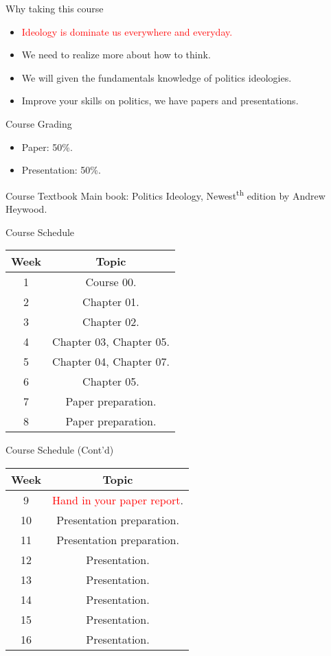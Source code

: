 \documentclass{beamer}
\begin{document}
\begin{frame}{Why taking this course}
\begin{itemize}
\pause
\item \textcolor{red}{Ideology is dominate us everywhere and everyday.}
\pause
\item We need to realize more about how to think.
\pause
\item We will given the fundamentals knowledge of politics ideologies.
\pause
\item Improve your skills on politics, we have papers and presentations.
\end{itemize}
\end{frame}
\begin{frame}{Course Grading}
\begin{itemize}
\pause
\item Paper: 50\%.
\vspace{1em}
\pause
\item Presentation: 50\%.
\end{itemize}
\end{frame}
\begin{frame}{Course Textbook}
\pause
Main book: Politics Ideology, Newest\textsuperscript{th} edition by Andrew Heywood. \\
\end{frame}
\begin{frame}{Course Schedule}
\begin{center}
\begin{tabular}{|c|c|}
\hline
Week & Topic \\
\hline
1 & Course 00.\\
\hline
2 & Chapter 01.\\
\hline
3 & Chapter 02.\\
\hline
4 & Chapter 03, Chapter 05.\\
\hline
5 & Chapter 04, Chapter 07.\\
\hline
6 & Chapter 05.\\
\hline
7 & Paper preparation.\\
\hline
8 & Paper preparation.\\
\hline
\end{tabular}
\end{center}
\end{frame}
\begin{frame}{Course Schedule (Cont'd)}
\begin{center}
\begin{tabular}{|c|c|}
\hline
Week & Topic \\
\hline
9 & \textcolor{red}{Hand in your paper report}.\\
\hline
10 & Presentation preparation.\\
\hline
11 & Presentation preparation.\\
\hline
12 & Presentation.\\
\hline
13 & Presentation.\\
\hline
14 & Presentation.\\
\hline
15 & Presentation.\\
\hline
16 & Presentation.\\
\hline
\end{tabular}
\end{center}
\end{frame}
\end{document}
